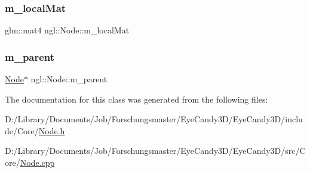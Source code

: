 \subsubsection{\texorpdfstring{m\+\_\+local\+Mat}{m\_localMat}}
{\footnotesize\ttfamily glm\+::mat4 ngl\+::\+Node\+::m\+\_\+local\+Mat\hspace{0.3cm}{\ttfamily [protected]}}

\mbox{\label{classngl_1_1_node_aee782f1aa45eaee442daa72f76fbc6e5}} 
\subsubsection{\texorpdfstring{m\+\_\+parent}{m\_parent}}
{\footnotesize\ttfamily \mbox{\hyperlink{classngl_1_1_node}{Node}}$\ast$ ngl\+::\+Node\+::m\+\_\+parent\hspace{0.3cm}{\ttfamily [protected]}}



The documentation for this class was generated from the following files\+:\begin{DoxyCompactItemize}
\item 
D\+:/\+Library/\+Documents/\+Job/\+Forschungsmaster/\+Eye\+Candy3\+D/\+Eye\+Candy3\+D/include/\+Core/\mbox{\hyperlink{_node_8h}{Node.\+h}}\item 
D\+:/\+Library/\+Documents/\+Job/\+Forschungsmaster/\+Eye\+Candy3\+D/\+Eye\+Candy3\+D/src/\+Core/\mbox{\hyperlink{_node_8cpp}{Node.\+cpp}}\end{DoxyCompactItemize}
